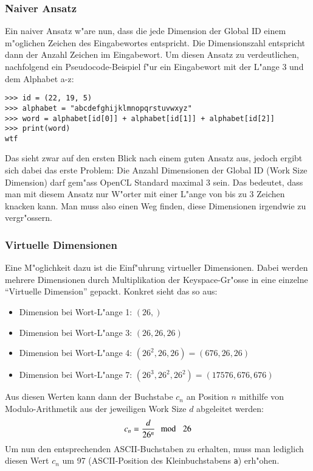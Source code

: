 \begin{refsection}
\subsubsection{Naiver Ansatz}

Ein naiver Ansatz w"are nun, dass die jede Dimension der Global ID einem
m"oglichen Zeichen des Eingabewortes entspricht. Die Dimensionszahl entspricht
dann der Anzahl Zeichen im Eingabewort. Um diesen Ansatz zu verdeutlichen,
nachfolgend ein Pseudocode-Beispiel f"ur ein Eingabewort mit der L"ange 3 und
dem Alphabet a-z:

\begin{small}
\begin{verbatim}
>>> id = (22, 19, 5)
>>> alphabet = "abcdefghijklmnopqrstuvwxyz"
>>> word = alphabet[id[0]] + alphabet[id[1]] + alphabet[id[2]]
>>> print(word)
wtf
\end{verbatim}
\end{small}

\noindent Das sieht zwar auf den ersten Blick nach einem guten Ansatz aus,
jedoch ergibt sich dabei das erste Problem: Die Anzahl Dimensionen der Global ID
(Work Size Dimension) darf gem"ass OpenCL Standard\cite{crypto:opencl_ref}
maximal 3 sein. Das bedeutet, dass man mit diesem Ansatz nur W"orter mit einer
L"ange von bis zu 3 Zeichen knacken kann. Man muss also einen Weg finden, diese
Dimensionen irgendwie zu vergr"ossern.

\subsubsection{Virtuelle Dimensionen}

Eine M"oglichkeit dazu ist die Einf"uhrung virtueller Dimensionen. Dabei werden
mehrere Dimensionen durch Multiplikation der Keyspace-Gr"osse in eine einzelne
``Virtuelle Dimension'' gepackt. Konkret sieht das so aus:

\begin{itemize}
	\item Dimension bei Wort-L"ange 1: $(26,)$
	\item Dimension bei Wort-L"ange 3: $(26, 26, 26)$
	\item Dimension bei Wort-L"ange 4: $(26^2, 26, 26) = (676, 26, 26)$
	\item Dimension bei Wort-L"ange 7: $(26^3, 26^2, 26^2) = (17576, 676, 676)$
\end{itemize}

\noindent Aus diesen Werten kann dann der Buchstabe $c_n$ an Position $n$ mithilfe von
Modulo-Arithmetik aus der jeweiligen Work Size $d$ abgeleitet werden:
\[
	c_n = \frac{d}{26^n} \mod\enskip 26
\]
Um nun den entsprechenden ASCII-Buchstaben zu erhalten, muss man lediglich
diesen Wert $c_n$ um 97 (ASCII-Position des Kleinbuchstabens \texttt{a})
erh"ohen.


\end{refsection}

